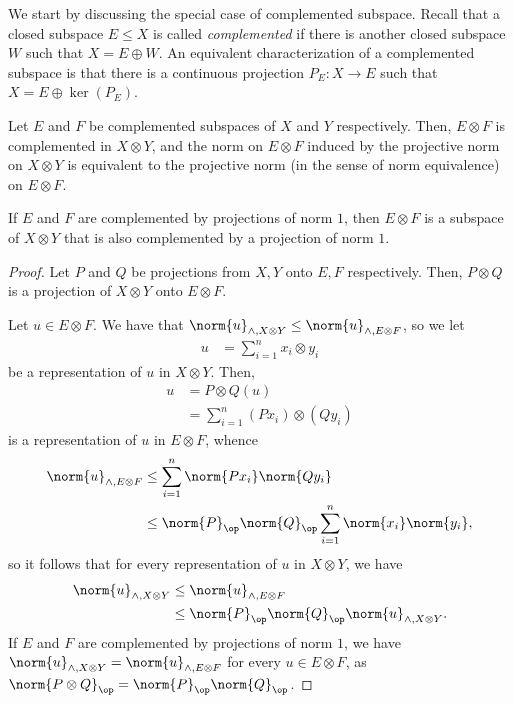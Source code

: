 \documentclass[10pt]{mypackage}
\begin{document}
We start by discussing the special case of complemented subspace. Recall that a closed subspace $E\leq X$ is called \textit{complemented} if there is another closed subspace $W$ such that $X = E\oplus W$. An equivalent characterization of a complemented subspace is that there is a continuous projection $P_E\colon X\rightarrow E$ such that $X = E\oplus \ker\left( P_E \right)$.
\begin{proposition}
  Let $E$ and $F$ be complemented subspaces of $X$ and $Y$ respectively. Then, $E\otimes F$ is complemented in $X\otimes Y$, and the norm on $E\otimes F$ induced by the projective norm on $X\otimes Y$ is equivalent to the projective norm (in the sense of norm equivalence) on $E\otimes F$.

  If $E$ and $F$ are complemented by projections of norm $1$, then $E\otimes F$ is a subspace of $X\otimes Y$ that is also complemented by a projection of norm $1$.
\end{proposition}
\begin{proof}
  Let $P$ and $Q$ be projections from $X,Y$ onto $E,F$ respectively. Then, $P\otimes Q$ is a projection of $X\otimes Y$ onto $E\otimes F$.

  Let $u\in E\otimes F$. We have that $\norm{u}_{\wedge,X\otimes Y}\leq \norm{u}_{\wedge,E\otimes F}$, so we let
  \begin{align*}
    u &= \sum_{i=1}^{n}x_i\otimes y_i
  \end{align*}
  be a representation of $u$ in $X\otimes Y$. Then,
  \begin{align*}
    u &= P\otimes Q(u)\\
      &= \sum_{i=1}^{n} \left( Px_i \right)\otimes \left( Qy_i \right)
  \end{align*}
  is a representation of $u$ in $E\otimes F$, whence
  \begin{align*}
    \norm{u}_{\wedge,E\otimes F} &\leq \sum_{i=1}^{n}\norm{Px_i}\norm{Qy_i}\\
                                 &\leq \norm{P}_{\op}\norm{Q}_{\op}\sum_{i=1}^{n}\norm{x_i}\norm{y_i},
  \end{align*}
  so it follows that for every representation of $u$ in $X\otimes Y$, we have
  \begin{align*}
    \norm{u}_{\wedge,X\otimes Y} &\leq \norm{u}_{\wedge,E\otimes F}\\
                                 &\leq \norm{P}_{\op}\norm{Q}_{\op}\norm{u}_{\wedge,X\otimes Y}.
  \end{align*}
  If $E$ and $F$ are complemented by projections of norm $1$, we have $\norm{u}_{\wedge,X\otimes Y} = \norm{u}_{\wedge,E\otimes F}$ for every $u\in E\otimes F$, as $\norm{P\otimes Q}_{\op} = \norm{P}_{\op}\norm{Q}_{\op}$.
\end{proof}
\end{document}
